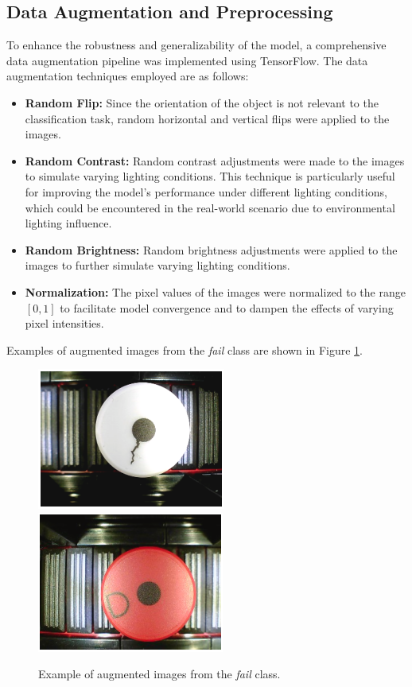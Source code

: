 \documentclass[lettersize,journal]{IEEEtran}
\begin{document}
\subsection*{Data Augmentation and Preprocessing}

To enhance the robustness and generalizability of the model, a comprehensive data augmentation pipeline was implemented using TensorFlow. The data augmentation techniques employed are as follows:

\begin{itemize}
  \item \textbf{Random Flip:} Since the orientation of the object is not relevant to the classification task, random horizontal and vertical flips were applied to the images.
  \item \textbf{Random Contrast:} Random contrast adjustments were made to the images to simulate varying lighting conditions. This technique is particularly useful for improving the model's performance under different lighting conditions, which could be encountered in the real-world scenario due to environmental lighting influence.
  \item \textbf{Random Brightness:} Random brightness adjustments were applied to the images to further simulate varying lighting conditions. 
  \item \textbf{Normalization:} The pixel values of the images were normalized to the range $[0, 1]$ to facilitate model convergence and to dampen the effects of varying pixel intensities.
\end{itemize}

Examples of augmented images from the \emph{fail} class are shown in Figure \ref{fig:augmented_images}.

\begin{figure}[!h]
  \centering
  \includegraphics[width=.2\textwidth]{images/augmented_fail.png}
  \includegraphics[width=.2\textwidth]{images/augmented_fail2.png}
  \caption{Example of augmented images from the \emph{fail} class.}
  \label{fig:augmented_images}
\end{figure}
\end{document}
